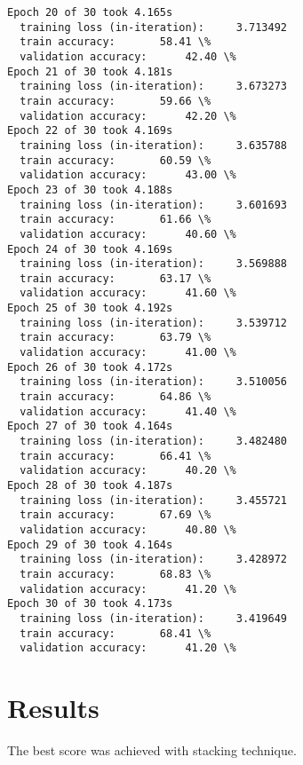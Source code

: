 \documentclass{article}
\begin{document}
\begin{Verbatim}[commandchars=\\\{\}]
Epoch 20 of 30 took 4.165s
  training loss (in-iteration):		3.713492
  train accuracy:		58.41 \%
  validation accuracy:		42.40 \%
Epoch 21 of 30 took 4.181s
  training loss (in-iteration):		3.673273
  train accuracy:		59.66 \%
  validation accuracy:		42.20 \%
Epoch 22 of 30 took 4.169s
  training loss (in-iteration):		3.635788
  train accuracy:		60.59 \%
  validation accuracy:		43.00 \%
Epoch 23 of 30 took 4.188s
  training loss (in-iteration):		3.601693
  train accuracy:		61.66 \%
  validation accuracy:		40.60 \%
Epoch 24 of 30 took 4.169s
  training loss (in-iteration):		3.569888
  train accuracy:		63.17 \%
  validation accuracy:		41.60 \%
Epoch 25 of 30 took 4.192s
  training loss (in-iteration):		3.539712
  train accuracy:		63.79 \%
  validation accuracy:		41.00 \%
Epoch 26 of 30 took 4.172s
  training loss (in-iteration):		3.510056
  train accuracy:		64.86 \%
  validation accuracy:		41.40 \%
Epoch 27 of 30 took 4.164s
  training loss (in-iteration):		3.482480
  train accuracy:		66.41 \%
  validation accuracy:		40.20 \%
Epoch 28 of 30 took 4.187s
  training loss (in-iteration):		3.455721
  train accuracy:		67.69 \%
  validation accuracy:		40.80 \%
Epoch 29 of 30 took 4.164s
  training loss (in-iteration):		3.428972
  train accuracy:		68.83 \%
  validation accuracy:		41.20 \%
Epoch 30 of 30 took 4.173s
  training loss (in-iteration):		3.419649
  train accuracy:		68.41 \%
  validation accuracy:		41.20 \%
    \end{Verbatim}

    \section{Results}\label{results}

    The best score was achieved with stacking technique.
\end{document}
